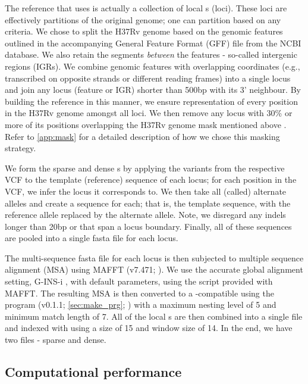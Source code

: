 The reference \panrg{} that \pandora{} uses is actually a collection of local \prg{}s (loci). These loci are effectively partitions of the original genome; one can partition based on any criteria. We chose to split the H37Rv genome based on the genomic features outlined in the accompanying General Feature Format (GFF) file from the NCBI database. We also retain the segments \emph{between} the features - so-called intergenic regions (IGRs). We combine genomic features with overlapping coordinates (e.g., transcribed on opposite strands or different reading frames) into a single locus and join any locus (feature or IGR) shorter than 500bp with its 3' neighbour. By building the reference \panrg{} in this manner, we ensure representation of every position in the H37Rv genome amongst all loci. We then remove any locus with 30\% or more of its positions overlapping the H37Rv genome mask mentioned above \cite{tbmask2014}. Refer to \autoref{app:mask} for a detailed description of how we chose this masking strategy.

We form the sparse and dense \panrg{}s by applying the variants from the respective VCF to the template (reference) sequence of each locus; for each position in the VCF, we infer the locus it corresponds to. We then take all (called) alternate alleles and create a sequence for each; that is, the template sequence, with the reference allele replaced by the alternate allele. Note, we disregard any indels longer than 20bp or that span a locus boundary. Finally, all of these sequences are pooled into a single fasta file for each locus. 

The multi-sequence fasta file for each locus is then subjected to multiple sequence alignment (MSA) using MAFFT (v7.471; \cite{nakamura2018}). We use the accurate global alignment setting, G-INS-i \cite{katoh2016}, with default parameters, using the  script provided with MAFFT. The resulting MSA is then converted to a \pandora{}-compatible \prg{} using the \makeprg{} program (v0.1.1; \autoref{sec:make_prg}; \cite{pandora}) with a maximum nesting level of 5 and minimum match length of 7. All of the local \prg{}s are then combined into a single \panrg{} file and indexed with \pandora{} using a \kmer{} size of 15 and window size of 14. In the end, we have two \panrg{} files - sparse and dense.

\subsection{Computational performance}
\label{sec:tbprg-comp-perf}


